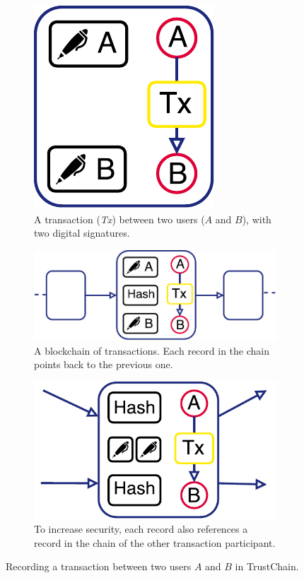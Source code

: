\begin{figure}[t]
	\centering
	\begin{subfigure}{.5\textwidth}
		\centering
		\captionsetup{width=.9\linewidth}
		\includegraphics[width=.35\linewidth]{iom/assets/trustchain_tutorial_1}
		\caption{A transaction (\emph{Tx}) between two users ($ A $ and $ B $), with two digital signatures.}
		\label{fig:trustchain_tutorial_1}
	\end{subfigure}
	\begin{subfigure}{.5\textwidth}
		\centering
		\captionsetup{width=.9\linewidth}
		\includegraphics[width=\linewidth]{iom/assets/trustchain_tutorial_2}
		\caption{A blockchain of transactions. Each record in the chain points back to the previous one.}
		\label{fig:trustchain_tutorial_2}
	\end{subfigure}\vspace{0.3cm}%
	\begin{subfigure}{.5\textwidth}
		\centering
		\captionsetup{width=.9\linewidth}
		\includegraphics[width=.7\linewidth]{iom/assets/trustchain_tutorial_3}
		\caption{To increase security, each record also references a record in the chain of the other transaction participant.}
		\label{fig:trustchain_tutorial_3}
	\end{subfigure}
	\caption{Recording a transaction between two users $ A $ and $ B $ in TrustChain.}
	\label{fig:trustchain_tutorial}
\end{figure}

